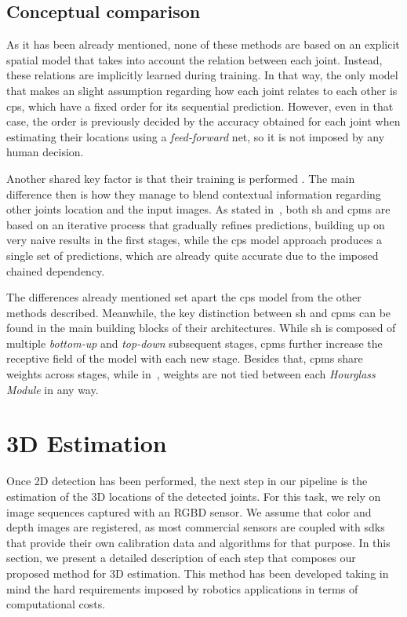 \subsection{Conceptual comparison}\label{subsec:conceptual_comparison}
As it has been already mentioned, none of these methods are based on an explicit spatial model that takes into account the relation between each joint. Instead, these relations are implicitly learned  during training. In that way, the only model that makes an slight assumption regarding how each joint relates to each other is \glspl{cp}, which have a fixed order for its sequential prediction. However, even in that case, the order is previously decided by the accuracy obtained for each joint when estimating their locations using a \emph{feed-forward} net, so it is not imposed by any human decision.

Another shared key factor is that their training is performed . The main difference then is how they manage to blend contextual information regarding other joints location and the input images. As stated in~\cite{Gkioxari2016-ix}, both \gls{sh} and \glspl{cpm} are based on an iterative process that gradually refines predictions, building up on very naive results in the first stages, while the \glspl{cp} model approach produces a single set of predictions, which are already quite accurate due to the imposed chained dependency.

The differences already mentioned set apart the \glspl{cp} model from the other methods described. Meanwhile, the key distinction between \gls{sh} and \glspl{cpm} can be found in the main building blocks of their architectures. While \gls{sh} is composed of multiple \emph{bottom-up} and \emph{top-down} subsequent stages, \glspl{cpm} further increase the receptive field of the model with each new stage. Besides that, \glspl{cpm} share weights across stages, while in~\cite{Newell2016-cy}, weights are not tied between each \emph{Hourglass Module} in any way.

\section{3D Estimation}\label{sec:3d_estimation}
Once 2D detection has been performed, the next step in our pipeline is the estimation of the 3D locations of the detected joints. For this task, we rely on image sequences captured with an RGBD sensor. We assume that color and depth images are registered, as most commercial sensors are coupled with \glspl{sdk} that provide their own calibration data and algorithms for that purpose. In this section, we present a detailed description of each step that composes our proposed method for 3D estimation. This method has been developed taking in mind the hard requirements imposed by robotics applications in terms of computational costs.


